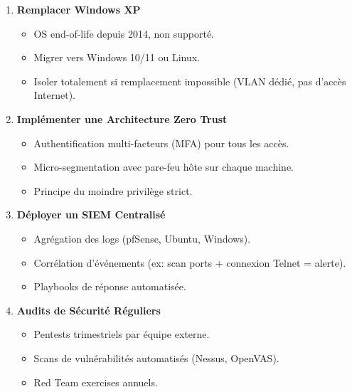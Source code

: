 \documentclass[12pt,a4paper,openany]{report}
\begin{document}
	\begin{enumerate}
		\item \textbf{Remplacer Windows XP}
		\begin{itemize}
			\item OS end-of-life depuis 2014, non supporté.
			\item Migrer vers Windows 10/11 ou Linux.
			\item Isoler totalement si remplacement impossible (VLAN dédié, pas d'accès Internet).
		\end{itemize}
		
		\item \textbf{Implémenter une Architecture Zero Trust}
		\begin{itemize}
			\item Authentification multi-facteurs (MFA) pour tous les accès.
			\item Micro-segmentation avec pare-feu hôte sur chaque machine.
			\item Principe du moindre privilège strict.
		\end{itemize}
		
		\item \textbf{Déployer un SIEM Centralisé}
		\begin{itemize}
			\item Agrégation des logs (pfSense, Ubuntu, Windows).
			\item Corrélation d'événements (ex: scan ports + connexion Telnet = alerte).
			\item Playbooks de réponse automatisée.
		\end{itemize}
		
		\item \textbf{Audits de Sécurité Réguliers}
		\begin{itemize}
			\item Pentests trimestriels par équipe externe.
			\item Scans de vulnérabilités automatisés (Nessus, OpenVAS).
			\item Red Team exercises annuels.
		\end{itemize}
	\end{enumerate}
	
\end{document}
